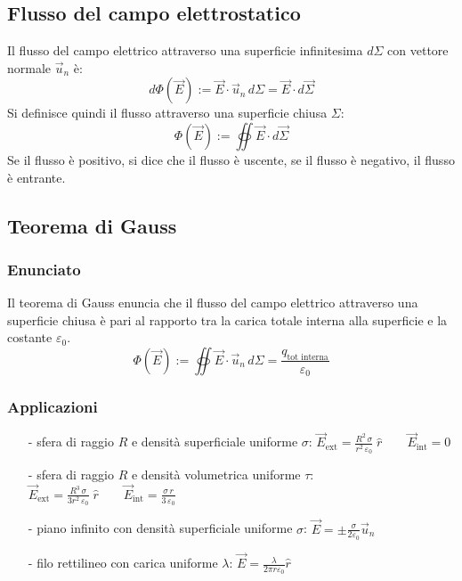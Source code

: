 \documentclass[a4paper]{article}
\newcommand\un{\vec{u}_n}
\begin{document}
\newpage

\subsection{Flusso del campo elettrostatico}
Il flusso del campo elettrico attraverso una superficie infinitesima \(d\Sigma\) con vettore normale \(\un\) è:
\[d\Phi(\vec{E}) := \vec{E} \cdot \un \, d\Sigma = \vec{E} \cdot d\vec{\Sigma}\]
Si definisce quindi il flusso attraverso una superficie chiusa \(\Sigma\):
\[\Phi(\vec{E}) := \oiint \vec{E} \cdot d\vec{\Sigma}\]
Se il flusso è positivo, si dice che il flusso è uscente, se il flusso è negativo, il flusso è entrante.

\subsection{Teorema di Gauss}
\subsubsection*{Enunciato}
Il teorema di Gauss enuncia che il flusso del campo elettrico attraverso una superficie chiusa è pari al rapporto tra la carica
totale interna alla superficie e la costante \(\varepsilon_0\).
\[\Phi(\vec{E}) := \oiint \vec{E} \cdot \un \, d\Sigma = \frac{q_\text{tot interna}}{\varepsilon_0}\]

\subsubsection*{Applicazioni}
\begin{itemize}[topsep=3pt, itemsep=0pt]
	\item[-] sfera di raggio \(R\) e densità superficiale uniforme \(\sigma\): \(\displaystyle \vec{E}_\text{ext} = \frac{R^2 \, \sigma}{r^2 \, \varepsilon_0} \; \hat{r} \qquad \vec{E}_\text{int} = 0\)
	\item[-] sfera di raggio \(R\) e densità volumetrica uniforme \(\tau\): \(\displaystyle \vec{E}_\text{ext} = \frac{R^3 \, \sigma}{3 r^2 \, \varepsilon_0} \; \hat{r} \qquad \vec{E}_\text{int} = \frac{\sigma \, r}{3 \, \varepsilon_0}\)
	\item[-] piano infinito con densità superficiale uniforme \(\sigma\): \(\displaystyle \vec{E} = \pm \frac{\sigma}{2 \varepsilon_0} \un\)
	\item[-] filo rettilineo con carica uniforme \(\lambda\): \(\displaystyle \vec{E} = \frac{\lambda}{2 \pi r \varepsilon_0} \hat{r}\)
\end{itemize}
\end{document}
